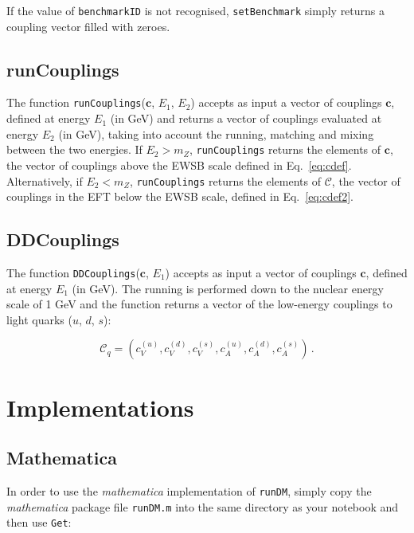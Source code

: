 \documentclass[notitlepage,12pt]{article}
\begin{document}
If the value of \texttt{benchmarkID} is not recognised, \texttt{setBenchmark} simply returns a coupling vector filled with zeroes.

\subsection{runCouplings}

The function \texttt{runCouplings}($\mathbf{c}$, $E_1$, $E_2$) accepts as input a vector of couplings $\mathbf{c}$, defined at energy $E_1$ (in GeV) and returns a vector of couplings evaluated at energy $E_2$ (in GeV), taking into account the running, matching and mixing between the two energies. If $E_2 > m_Z$, \texttt{runCouplings} returns the elements of $\mathbf{c}$, the vector of couplings above the EWSB scale defined in Eq.~\ref{eq:cdef}. Alternatively, if $E_2 < m_Z$, \texttt{runCouplings} returns the elements of $\mathbf{\mathcal{C}}$, the vector of couplings in the EFT below the EWSB scale, defined in Eq.~\ref{eq:cdef2}.

\subsection{DDCouplings}

The function \texttt{DDCouplings}($\mathbf{c}$, $E_1$) accepts as input a vector of couplings $\mathbf{c}$, defined at energy $E_1$ (in GeV). The running is performed down to the nuclear energy scale of 1 GeV and the function returns a vector of the low-energy couplings to light quarks ($u$, $d$, $s$): 

\begin{equation}
\mathcal{C}_q = \left( c_V^{(u)}, c_V^{(d)}, c_V^{(s)}, c_A^{(u)}, c_A^{(d)}, c_A^{(s)} \right)\,.
\end{equation}


\section{Implementations}
\label{sec:implementations}

\subsection{Mathematica}

In order to use the \textit{mathematica} implementation of \texttt{runDM}, simply copy the \textit{mathematica} package file \texttt{runDM.m} into the same directory as your notebook and then use \texttt{Get}:
\end{document}
